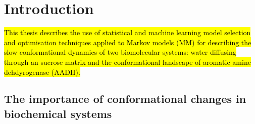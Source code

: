 %
%
\let\textcircled=\pgftextcircled
\chapter{Introduction}
\label{chap:intro}


\hl{This thesis describes the use of statistical and machine learning  model selection and optimisation techniques applied to Markov models (MM) for describing the slow conformational dynamics of two biomolecular systems: water diffusing through an sucrose matrix and the conformational landscape of aromatic amine dehdyrogenase (AADH).}

\section{The importance of conformational changes in biochemical systems}


